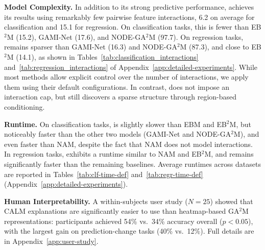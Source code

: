 \textbf{Model Complexity.}
In addition to its strong predictive performance, \method{} achieves its results using remarkably few pairwise feature interactions, 6.2 on average for classification and 15.1 for regression. On classification tasks, this is fewer than EB$^2$M (15.2), GAMI-Net (17.6), and NODE-GA$^2$M (97.7). On regression tasks, \method{} remains sparser than GAMI-Net (16.3) and NODE-GA$^2$M (87.3), and close to EB$^2$M (14.1), as shown in Tables~\ref{tab:classification_interactions} and~\ref{tab:regression_interactions} of Appendix~\ref{app:detailed-experiments}. While most \gamm{} methods allow explicit control over the number of interactions, we apply them using their default configurations. In contrast, \method{} does not impose an interaction cap, but still discovers a sparse structure through region-based conditioning.

\textbf{Runtime.}
On classification tasks, \method{} is slightly slower than EBM and EB$^2$M, but noticeably faster than the other two \gamm{} models (GAMI-Net and NODE-GA$^2$M), and even faster than NAM, despite the fact that NAM does not model interactions. In regression tasks, \method{} exhibits a runtime similar to NAM and EB$^2$M, and remains significantly faster than the remaining \gamm{} baselines. Average runtimes across datasets are reported in Tables~\ref{tab:clf-time-def} and~\ref{tab:regr-time-def} (Appendix~\ref{app:detailed-experiments}).

\textbf{Human Interpretability.} A within-subjects user study ($N=25$) showed that CALM explanations are significantly easier to use than heatmap-based GA$^2$M representations: participants achieved 54\% vs.\ 34\% accuracy overall ($p<0.05$), with the largest gain on prediction-change tasks (40\% vs.\ 12\%). Full details are in Appendix~\ref{app:user-study}.
